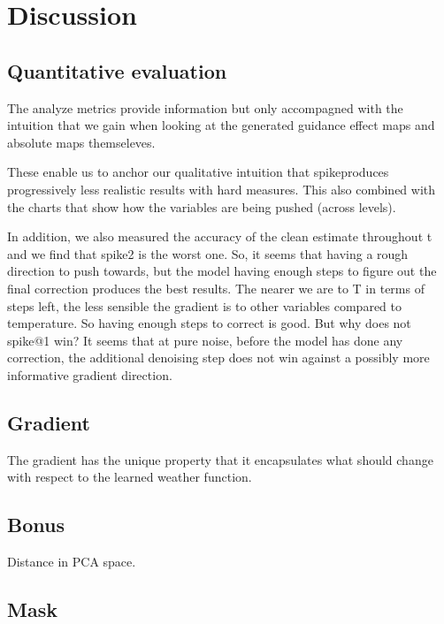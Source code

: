 \chapter{Discussion}\label{ch:discussion}

\section{Quantitative evaluation}

The analyze metrics provide information but only accompagned with the intuition that we gain when looking at the generated guidance effect maps and absolute maps themseleves.

These enable us to anchor our qualitative intuition that spike\@ produces progressively less realistic results with hard measures.
This also combined with the charts that show how the variables are being pushed (across levels).

In addition, we also measured the accuracy of the clean estimate throughout t and we find that spike\@2 is the worst one.
So, it seems that having a rough direction to push towards, but the model having enough steps to figure out the final correction produces the best results.
The nearer we are to T in terms of steps left, the less sensible the gradient is to other variables compared to temperature.
So having enough steps to correct is good.
But why does not spike@1 win? It seems that at pure noise, before the model has done any correction, the additional denoising step does not win against a possibly more informative gradient direction.


\section{Gradient}
The gradient has the unique property that it encapsulates what should change with respect to the learned weather function.

\section{Bonus}
Distance in PCA space.

\section{Mask}


